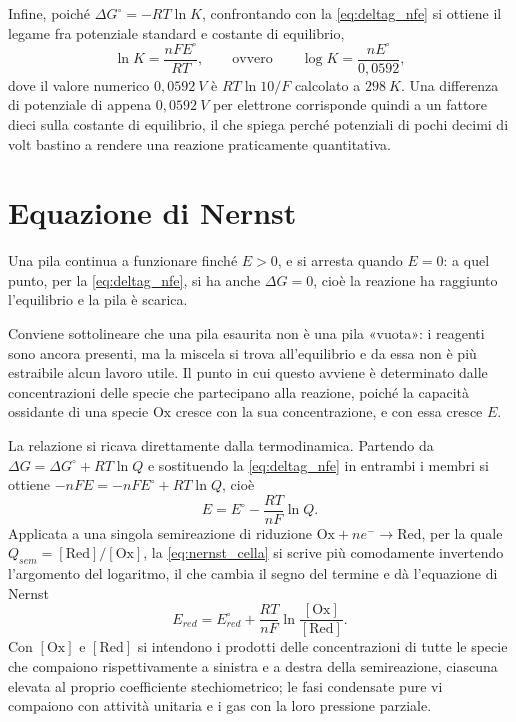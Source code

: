 Infine, poiché $\Delta G^\circ = -RT \ln K$, confrontando con la \eqref{eq:deltag_nfe} si ottiene il legame fra potenziale standard e costante di equilibrio,
\begin{equation}
    \ln K = \frac{nFE^\circ}{RT} ,
    \qquad\text{ovvero}\qquad
    \log K = \frac{n E^\circ}{0{,}0592} ,
    \label{eq:logk}
\end{equation}
dove il valore numerico $0{,}0592 \ V$ è $RT\ln 10/F$ calcolato a $298 \ K$.
Una differenza di potenziale di appena $0{,}0592 \ V$ per elettrone corrisponde quindi a un fattore dieci sulla costante di equilibrio, il che spiega perché potenziali di pochi decimi di volt bastino a rendere una reazione praticamente quantitativa.
 
\section{Equazione di Nernst}
 
Una pila continua a funzionare finché $E > 0$, e si arresta quando $E = 0$: a quel punto, per la \eqref{eq:deltag_nfe}, si ha anche $\Delta G = 0$, cioè la reazione ha raggiunto l'equilibrio e la pila è scarica.

Conviene sottolineare che una pila esaurita non è una pila «vuota»: i reagenti sono ancora presenti, ma la miscela si trova all'equilibrio e da essa non è più estraibile alcun lavoro utile.
Il punto in cui questo avviene è determinato dalle concentrazioni delle specie che partecipano alla reazione, poiché la capacità ossidante di una specie $\mathrm{Ox}$ cresce con la sua concentrazione, e con essa cresce $E$.
 
La relazione si ricava direttamente dalla termodinamica.
Partendo da $\Delta G = \Delta G^\circ + RT \ln Q$ e sostituendo la \eqref{eq:deltag_nfe} in entrambi i membri si ottiene $-nFE = -nFE^\circ + RT \ln Q$, cioè
\begin{equation}
    E = E^\circ - \frac{RT}{nF} \ln Q .
    \label{eq:nernst_cella}
\end{equation}
Applicata a una singola semireazione di riduzione $\mathrm{Ox} + ne^- \rightarrow \mathrm{Red}$, per la quale $Q_{sem} = [\mathrm{Red}]/[\mathrm{Ox}]$, la \eqref{eq:nernst_cella} si scrive più comodamente invertendo l'argomento del logaritmo, il che cambia il segno del termine e dà l'equazione di Nernst
\begin{equation}
    E_{red} = E^\circ_{red} + \frac{RT}{nF} \ln \frac{[\mathrm{Ox}]}{[\mathrm{Red}]} .
    \label{eq:nernst}
\end{equation}
Con $[\mathrm{Ox}]$ e $[\mathrm{Red}]$ si intendono i prodotti delle concentrazioni di tutte le specie che compaiono rispettivamente a sinistra e a destra della semireazione, ciascuna elevata al proprio coefficiente stechiometrico; le fasi condensate pure vi compaiono con attività unitaria e i gas con la loro pressione parziale.
 
